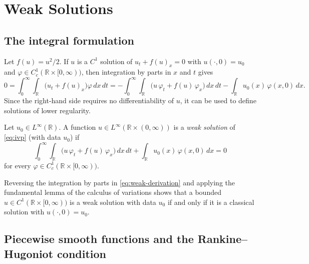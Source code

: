 
\section{Weak Solutions}
\label{sec:weak-solutions}

\subsection{The integral formulation}
\label{subsec:integral-form}

Let $f(u)=u^2/2$. If $u$ is a $C^1$ solution of $u_t + f(u)_x = 0$ with
$u(\cdot,0)=u_0$ and $\varphi \in C_c^1(\mathbb{R} \times [0,\infty))$, then
integration by parts in $x$ and $t$ gives
\begin{equation}
  \label{eq:weak-derivation}
  0 = \int_0^\infty\!\!\int_{\mathbb{R}} \big(u_t + f(u)_x\big)\varphi\, dx\, dt
  = -\int_0^\infty\!\!\int_{\mathbb{R}} \big(u\,\varphi_t + f(u)\,\varphi_x\big)\, dx\, dt
  - \int_{\mathbb{R}} u_0(x)\, \varphi(x,0)\, dx .
\end{equation}
Since the right-hand side requires no differentiability of $u$, it can be used to define solutions of lower regularity.

\begin{definition}
\label{def:weak-solution}
Let $u_0\in L^\infty(\mathbb{R})$. A function $u \in
L^\infty(\mathbb{R}\times(0,\infty))$ is a \emph{weak solution} of
\eqref{eq:ivp} (with data $u_0$) if
\begin{equation}
  \label{eq:weak-formulation}
  \int_0^\infty\!\!\int_{\mathbb{R}} \big(u\,\varphi_t + f(u)\,\varphi_x\big)\, dx\, dt
  + \int_{\mathbb{R}} u_0(x)\, \varphi(x,0)\, dx = 0
\end{equation}
for every $\varphi \in C_c^1(\mathbb{R}\times[0,\infty))$.
\end{definition}

Reversing the integration by parts in \eqref{eq:weak-derivation} and applying
the fundamental lemma of the calculus of variations shows that a bounded
$u\in C^1(\mathbb{R}\times[0,\infty))$ is a weak solution with data $u_0$ if and
only if it is a classical solution with $u(\cdot,0)=u_0$.

\subsection{Piecewise smooth functions and the Rankine--Hugoniot condition}
\label{subsec:rankine-hugoniot}

